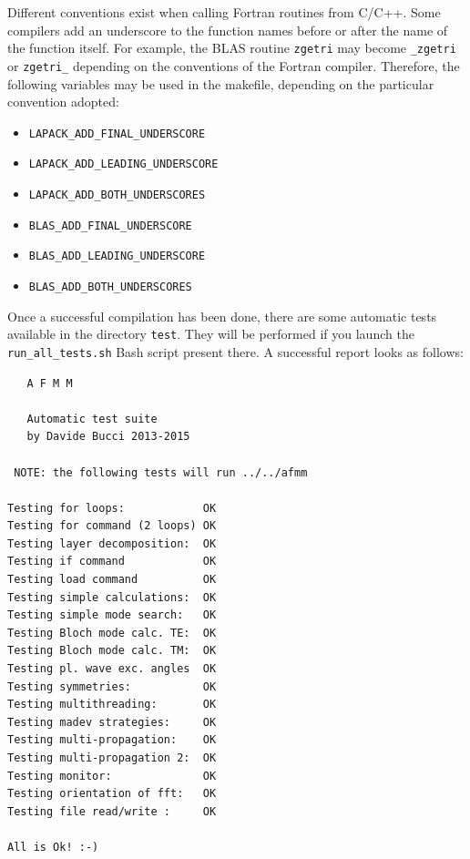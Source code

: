 %
%
Different conventions exist when calling Fortran routines from C/C++. Some compilers add an underscore to the function names before or after the name of the function itself. For example, the BLAS routine \lstinline!zgetri! may become \lstinline!_zgetri! or \lstinline!zgetri_! depending on the conventions of the Fortran compiler. Therefore, the following variables may be used in the makefile, depending on the particular convention adopted:
\begin{itemize}
\item\lstinline!LAPACK_ADD_FINAL_UNDERSCORE!
\item\lstinline!LAPACK_ADD_LEADING_UNDERSCORE!
\item\lstinline!LAPACK_ADD_BOTH_UNDERSCORES!
\item\lstinline!BLAS_ADD_FINAL_UNDERSCORE!
\item\lstinline!BLAS_ADD_LEADING_UNDERSCORE!
\item\lstinline!BLAS_ADD_BOTH_UNDERSCORES!
\end{itemize}

Once a successful compilation has been done, there are some automatic tests available in the directory  \lstinline!test!. They will be performed if you launch the  \lstinline!run_all_tests.sh! Bash script present there. A successful report looks as follows:
\begin{lstlisting}
   A F M M

   Automatic test suite
   by Davide Bucci 2013-2015

 NOTE: the following tests will run ../../afmm

Testing for loops:            OK
Testing for command (2 loops) OK
Testing layer decomposition:  OK
Testing if command            OK
Testing load command          OK
Testing simple calculations:  OK
Testing simple mode search:   OK
Testing Bloch mode calc. TE:  OK
Testing Bloch mode calc. TM:  OK
Testing pl. wave exc. angles  OK
Testing symmetries:           OK
Testing multithreading:       OK
Testing madev strategies:     OK
Testing multi-propagation:    OK
Testing multi-propagation 2:  OK
Testing monitor:              OK
Testing orientation of fft:   OK
Testing file read/write :     OK

All is Ok! :-)
\end{lstlisting}
\lstset{language=AFMM}

